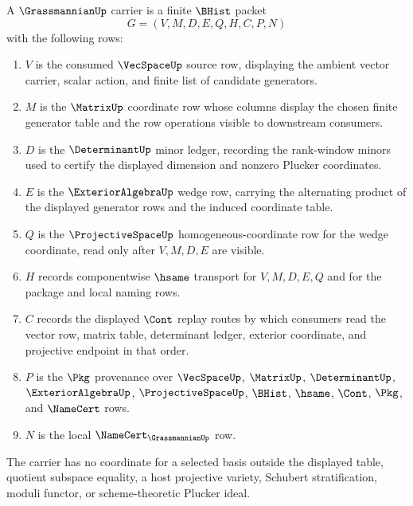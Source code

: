 \begin{definition}
\label{def:grassmannian-carrier}
A $\GrassmannianUp$ carrier is a finite $\BHist$ packet
$$
G=(V,M,D,E,Q,H,C,P,N)
$$
with the following rows:
\begin{enumerate}
\item $V$ is the consumed $\VecSpaceUp$ source row, displaying the ambient vector carrier, scalar action, and finite list of candidate generators.
\item $M$ is the $\MatrixUp$ coordinate row whose columns display the chosen finite generator table and the row operations visible to downstream consumers.
\item $D$ is the $\DeterminantUp$ minor ledger, recording the rank-window minors used to certify the displayed dimension and nonzero Plucker coordinates.
\item $E$ is the $\ExteriorAlgebraUp$ wedge row, carrying the alternating product of the displayed generator rows and the induced coordinate table.
\item $Q$ is the $\ProjectiveSpaceUp$ homogeneous-coordinate row for the wedge coordinate, read only after $V,M,D,E$ are visible.
\item $H$ records componentwise $\hsame$ transport for $V,M,D,E,Q$ and for the package and local naming rows.
\item $C$ records the displayed $\Cont$ replay routes by which consumers read the vector row, matrix table, determinant ledger, exterior coordinate, and projective endpoint in that order.
\item $P$ is the $\Pkg$ provenance over $\VecSpaceUp$, $\MatrixUp$, $\DeterminantUp$, $\ExteriorAlgebraUp$, $\ProjectiveSpaceUp$, $\BHist$, $\hsame$, $\Cont$, $\Pkg$, and $\NameCert$ rows.
\item $N$ is the local $\NameCert_{\GrassmannianUp}$ row.
\end{enumerate}
The carrier has no coordinate for a selected basis outside the displayed table, quotient subspace equality, a host projective variety, Schubert stratification, moduli functor, or scheme-theoretic Plucker ideal.
\end{definition}

